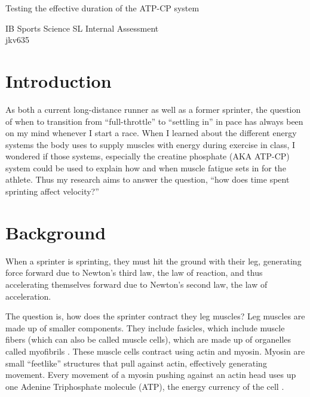 \documentclass[index]{subfiles}
\begin{document}
\begin{titlepage}
    \begin{center}
        \vspace*{1cm}

        {\huge{Testing the effective duration of the ATP-CP system}}

        \vspace{1.5cm}

        \vfill

        IB Sports Science SL Internal Assessment\\
        jkv635\\

    \end{center}
\end{titlepage}

\tableofcontents
\thispagestyle{empty}
\newpage
\setcounter{page}{1}

\section{Introduction}

As both a current long-distance runner as well as a former sprinter, the question of when to transition from ``full-throttle'' to ``settling in'' in pace has always been on my mind whenever I start a race. When I learned about the different energy systems the body uses to supply muscles with energy during exercise in class, I wondered if those systems, especially the creatine phosphate (AKA ATP-CP) system could be used to explain how and when muscle fatigue sets in for the athlete. Thus my research aims to answer the question, ``how does time spent sprinting affect velocity?''

\section{Background}

When a sprinter is sprinting, they must hit the ground with their leg, generating force forward due to Newton's third law, the law of reaction, and thus accelerating themselves forward due to Newton's second law, the law of acceleration.

The question is, how does the sprinter contract they leg muscles?  Leg muscles are made up of smaller components. They include fasicles, which include muscle fibers (which can also be called muscle cells), which are made up of organelles called myofibrils \parencite[10.2 skeletal muscle]{openstax2013muscle}. These muscle cells contract using actin and myosin. Myosin are small ``feetlike'' structures that pull against actin, effectively generating movement. Every movement of a myosin pushing against an actin head uses up one Adenine Triphosphate molecule (ATP), the energy currency of the cell \parencite[10.3]{openstax2013muscle}.
\end{document}
